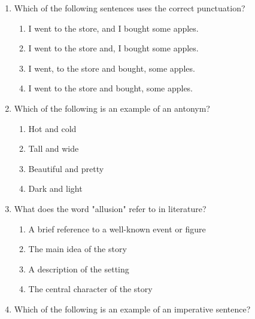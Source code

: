 \documentclass[12pt]{article}
\begin{document}
\begin{enumerate}
    \vspace{0.5cm}

    \item Which of the following sentences uses the correct punctuation?

    \begin{enumerate}[label=\Alph*.]
        \item I went to the store, and I bought some apples.
        \item I went to the store and, I bought some apples.
        \item I went, to the store and bought, some apples.
        \item I went to the store and bought, some apples.
    \end{enumerate}

    \vspace{0.5cm}

    \item Which of the following is an example of an antonym?

    \begin{enumerate}[label=\Alph*.]
        \item Hot and cold
        \item Tall and wide
        \item Beautiful and pretty
        \item Dark and light
    \end{enumerate}

    \vspace{0.5cm}

    \item What does the word "allusion" refer to in literature?

    \begin{enumerate}[label=\Alph*.]
        \item A brief reference to a well-known event or figure
        \item The main idea of the story
        \item A description of the setting
        \item The central character of the story
    \end{enumerate}

    \vspace{0.5cm}

    \item Which of the following is an example of an imperative sentence?


\end{enumerate}
\end{document}
